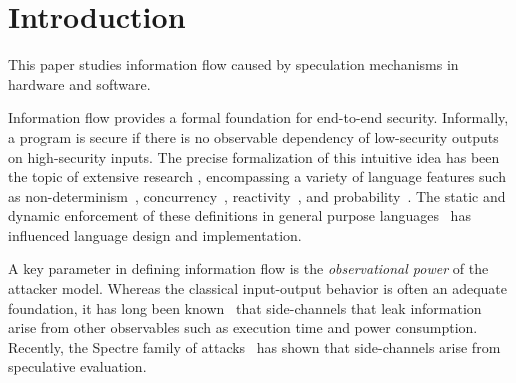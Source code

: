 \section{Introduction}

This paper studies information flow caused by speculation mechanisms
in hardware and software.

Information flow provides a formal
foundation for end-to-end security.  Informally, a program is secure
if there is no observable dependency of low-security outputs on high-security inputs.
The precise formalization of this intuitive idea has been the topic of
extensive research \cite{Sabelfeld:2006:LIS:2312191.2314769}, encompassing a variety of language
features such as non-determinism~\cite{Wittbold1990InformationFI},
concurrency~\cite{Smith:1998:SIF:268946.268975}, reactivity~\cite{O'Neill:2006:ISI:1155442.1155677}, and
probability~\cite{Gray:1992:TMF:2699806.2699811}. The static and dynamic enforcement
of these definitions in general purpose languages~\cite{myers-popl99} has %
influenced language design and implementation.

A key parameter in defining information flow is the \emph{observational power} of the attacker model. Whereas the classical
input-output behavior is often an adequate foundation,
it has long been known~\cite{Lampson:1973:NCP:362375.362389,Biswas:2017:STC:3058791.3023872} that side-channels that leak
information arise from other observables such as execution time and
power consumption.
Recently, the Spectre family of attacks~\cite{DBLP:journals/corr/abs-1801-01203} has
shown that side-channels arise from speculative evaluation.

